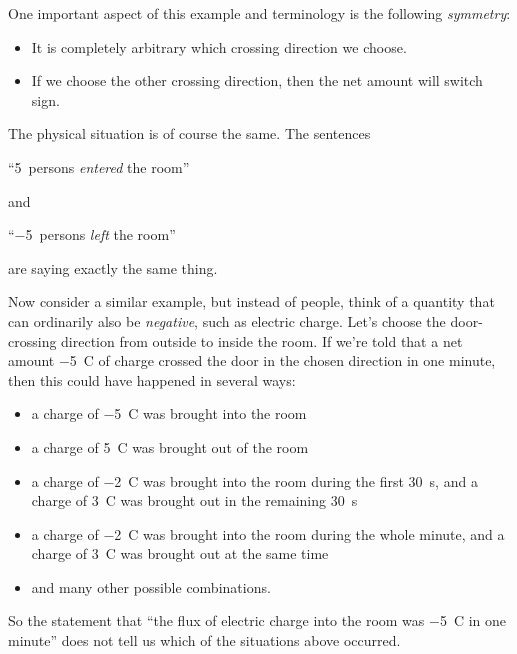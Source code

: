 \documentclass[a4paper,12pt,%
onecolumn,oneside,%
british%
]{memoir}
\newcommand{\langnohyph}[1]{\begin{hyphenrules}{nohyphenation}#1\end{hyphenrules}}
\newcommand*{\amp}{\&}
\renewcommand*{\|}[1][]{\nonscript\:#1\vert\nonscript\:\mathopen{}}
\begin{document}
One important aspect of this example and terminology is the following \emph{symmetry}:
\begin{itemize}
\item It is completely arbitrary which crossing direction we choose.
\item If we choose the other crossing direction, then the net amount will switch sign.
\end{itemize}
The physical situation is of course the same. The sentences
\begin{center}
  \enquote{\qty{+5}{persons} \emph{entered} the room}
\end{center}
and
\begin{center}
  \enquote{\qty{-5}{persons} \emph{left} the room}
\end{center}
are saying exactly the same thing.

\medskip

Now consider a similar example, but instead of people, think of a quantity that can ordinarily also be \emph{negative}, such as electric charge. Let's choose the door-crossing direction from outside to inside the room. If we're told that a net amount \qty{-5}{C} of charge crossed the door in the chosen direction in one minute, then this could have happened in several ways:\noprelistbreak
\begin{itemize}
\item a charge of \qty{-5}{C} was brought into the room
\item a charge of \qty{+5}{C} was brought out of the room
\item a charge of \qty{-2}{C} was brought into the room during the first \qty{30}{s}, and a charge of \qty{+3}{C} was brought out in the remaining \qty{30}{s}
\item a charge of \qty{-2}{C} was brought into the room during the whole minute, and a charge of \qty{+3}{C} was brought out at the same time
\item \textellipsis and many other possible combinations.
\end{itemize}
So the statement that \enquote{the flux of electric charge into the room was \qty{-5}{C} in one minute} does not tell us which of the situations above occurred.
\end{document}
